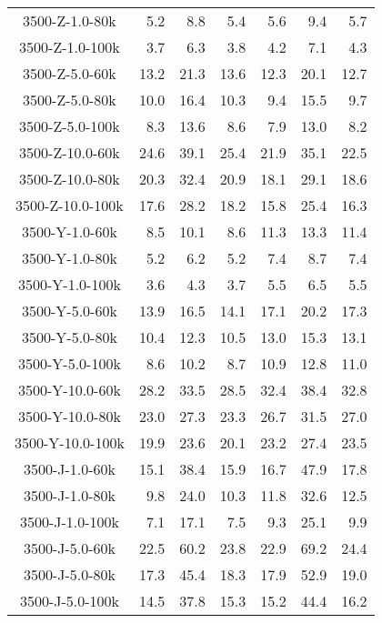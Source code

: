 \begin{longtable}{crrrrrr}
      3500-Z-1.0-80k   &   5.2 &   8.8 &   5.4 &   5.6 &   9.4 &   5.7 \\
      3500-Z-1.0-100k  &   3.7 &   6.3 &   3.8 &   4.2 &   7.1 &   4.3 \\
      3500-Z-5.0-60k   &  13.2 &  21.3 &  13.6 &  12.3 &  20.1 &  12.7 \\
      3500-Z-5.0-80k   &  10.0 &  16.4 &  10.3 &   9.4 &  15.5 &   9.7 \\
      3500-Z-5.0-100k  &   8.3 &  13.6 &   8.6 &   7.9 &  13.0 &   8.2 \\
      3500-Z-10.0-60k  &  24.6 &  39.1 &  25.4 &  21.9 &  35.1 &  22.5 \\
      3500-Z-10.0-80k  &  20.3 &  32.4 &  20.9 &  18.1 &  29.1 &  18.6 \\
      3500-Z-10.0-100k &  17.6 &  28.2 &  18.2 &  15.8 &  25.4 &  16.3 \\
      3500-Y-1.0-60k   &   8.5 &  10.1 &   8.6 &  11.3 &  13.3 &  11.4 \\
      3500-Y-1.0-80k   &   5.2 &   6.2 &   5.2 &   7.4 &   8.7 &   7.4 \\
      3500-Y-1.0-100k  &   3.6 &   4.3 &   3.7 &   5.5 &   6.5 &   5.5 \\
      3500-Y-5.0-60k   &  13.9 &  16.5 &  14.1 &  17.1 &  20.2 &  17.3 \\
      3500-Y-5.0-80k   &  10.4 &  12.3 &  10.5 &  13.0 &  15.3 &  13.1 \\
      3500-Y-5.0-100k  &   8.6 &  10.2 &   8.7 &  10.9 &  12.8 &  11.0 \\
      3500-Y-10.0-60k  &  28.2 &  33.5 &  28.5 &  32.4 &  38.4 &  32.8 \\
      3500-Y-10.0-80k  &  23.0 &  27.3 &  23.3 &  26.7 &  31.5 &  27.0 \\
      3500-Y-10.0-100k &  19.9 &  23.6 &  20.1 &  23.2 &  27.4 &  23.5 \\
      3500-J-1.0-60k   &  15.1 &  38.4 &  15.9 &  16.7 &  47.9 &  17.8 \\
      3500-J-1.0-80k   &   9.8 &  24.0 &  10.3 &  11.8 &  32.6 &  12.5 \\
      3500-J-1.0-100k  &   7.1 &  17.1 &   7.5 &   9.3 &  25.1 &   9.9 \\
      3500-J-5.0-60k   &  22.5 &  60.2 &  23.8 &  22.9 &  69.2 &  24.4 \\
      3500-J-5.0-80k   &  17.3 &  45.4 &  18.3 &  17.9 &  52.9 &  19.0 \\
      3500-J-5.0-100k  &  14.5 &  37.8 &  15.3 &  15.2 &  44.4 &  16.2 \\

\end{longtable}
